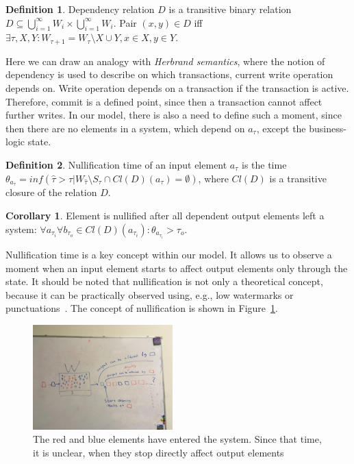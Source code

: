 \documentclass[sigconf]{acmart}
\theoremstyle{definition}
\newtheorem{definition}{Definition}
\newtheorem{corollary}{Corollary}
\begin{document}
\begin{definition}{Dependency relation}
$D$ is a transitive binary relation $D\subseteq{{\bigcup^{\infty}_{i=1}{W_i}}\times{{\bigcup^{\infty}_{i=1}{W_i}}}}$. Pair $(x,y)\in{D}$ iff $\exists{\tau,X,Y}:W_{\tau+1}=W_\tau\setminus{X}\cup{Y}, x\in{X}, y\in{Y}$.
\end{definition}

Here we can draw an analogy with {\em Herbrand semantics}, where the notion of dependency is used to describe on which transactions, current write operation depends on. Write operation depends on a transaction if the transaction is active. Therefore, commit is a defined point, since then a transaction cannot affect further writes. In our model, there is also a need to define such a moment, since then there are no elements in a system, which depend on $a_\tau$, except the business-logic state.

\begin{definition}{Nullification time}
of an input element $a_\tau$ is the time $\theta_{a_\tau}=inf(\hat{\tau}>\tau|W_{\hat{\tau}}\setminus{S_{\hat{\tau}}}\cap{Cl(D)(a_\tau)=\emptyset})$, where $Cl(D)$ is a transitive closure of the relation $D$.
\end{definition}

\begin{corollary}
Element is nullified after all dependent output elements left a system: $\forall{a_{\tau_i}}\forall{b_{\tau_o}\in{Cl(D)(a_{\tau_i})}}:\theta_{a_{\tau_i}}>\tau_o$.
\end{corollary}

Nullification time is a key concept within our model. It allows us to observe a moment when an input element starts to affect output elements only through the state. It should be noted that nullification is not only a theoretical concept, because it can be practically observed using, e.g., low watermarks or punctuations~\cite{Tucker:2003:EPS:776752.776780}. The concept of nullification is shown in Figure~\ref{nullification}.

\begin{figure}[htbp]
  \centering
  \includegraphics[width=0.48\textwidth]{pics/nullification}
  \caption{The red and blue elements have entered the system. Since that time, it is unclear, when they stop directly affect output elements}
  \label {nullification}
\end{figure}
\end{document}
